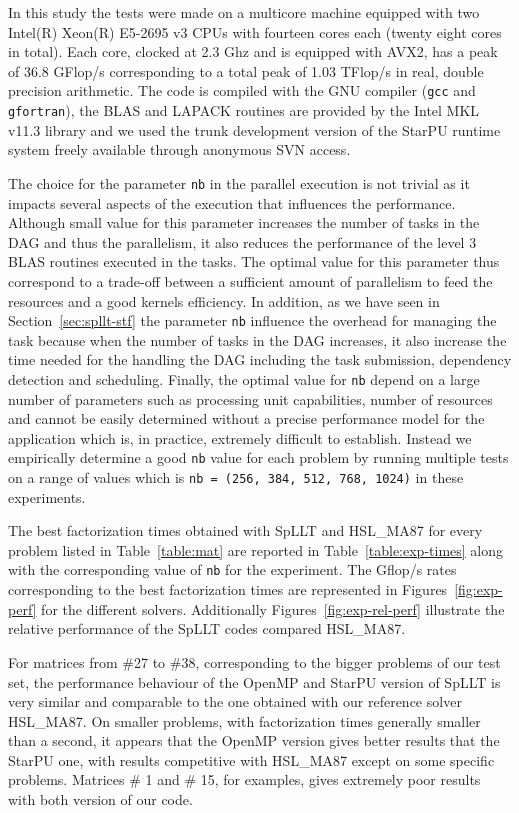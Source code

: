 \documentclass{article}
\newcommand{\starpu}{{StarPU}\xspace}
\newcommand{\openmp}{OpenMP\xspace}
\newcommand{\ma}{HSL\_MA87\xspace}
\newcommand{\spllt}{SpLLT\xspace}
\newcommand{\nb}{\texttt{nb}\xspace}
\begin{document}
In this study the tests were made on a multicore machine equipped with
two Intel(R) Xeon(R) E5-2695 v3 CPUs with fourteen cores each (twenty
eight cores in total). Each core, clocked at 2.3 Ghz and is equipped
with AVX2, has a peak of 36.8 GFlop/s corresponding to a total peak of
1.03 TFlop/s in real, double precision arithmetic. The code is
compiled with the GNU compiler (\texttt{gcc} and \texttt{gfortran}),
the BLAS and LAPACK routines are provided by the Intel MKL v11.3
library and we used the trunk development version of the \starpu
runtime system freely available through anonymous SVN access.

The choice for the parameter \nb in the parallel execution is not
trivial as it impacts several aspects of the execution that influences
the performance. Although small value for this parameter increases the
number of tasks in the DAG and thus the parallelism, it also reduces
the performance of the level 3 BLAS routines executed in the
tasks. The optimal value for this parameter thus correspond to a
trade-off between a sufficient amount of parallelism to feed the
resources and a good kernels efficiency. In addition, as we have seen
in Section~\ref{sec:spllt-stf} the parameter \nb influence the
overhead for managing the task because when the number of tasks in the
DAG increases, it also increase the time needed for the handling the
DAG including the task submission, dependency detection and
scheduling. Finally, the optimal value for \nb depend on a large
number of parameters such as processing unit capabilities, number of
resources and cannot be easily determined without a precise
performance model for the application which is, in practice, extremely
difficult to establish. Instead we empirically determine a good \nb
value for each problem by running multiple tests on a range of values
which is \texttt{nb = (256, 384, 512, 768, 1024)} in these experiments.

The best factorization times obtained with \spllt and \ma for every
problem listed in Table~\ref{table:mat} are reported in
Table~\ref{table:exp-times} along with the corresponding value of \nb
for the experiment. The Gflop/s rates corresponding to the best
factorization times are represented in Figures~\ref{fig:exp-perf} for
the different solvers. Additionally Figures~\ref{fig:exp-rel-perf}
illustrate the relative performance of the \spllt codes compared \ma.

For matrices from \#27 to \#38, corresponding to the bigger problems
of our test set, the performance behaviour of the \openmp and \starpu
version of \spllt is very similar and comparable to the one obtained
with our reference solver \ma. On smaller problems, with factorization
times generally smaller than a second, it appears that the \openmp
version gives better results that the \starpu one, with results
competitive with \ma except on some specific problems. Matrices \# 1
and \# 15, for examples, gives extremely poor results with both
version of our code.
\end{document}
